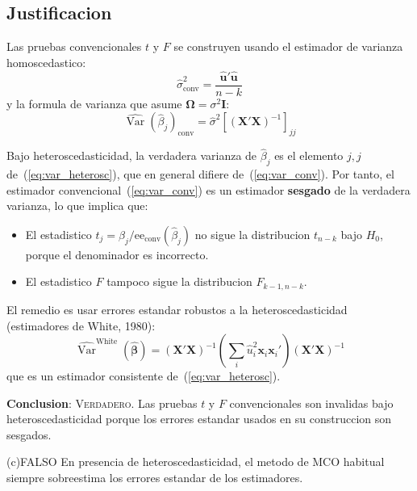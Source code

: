 \documentclass[12pt, letterpaper]{article}
\theoremstyle{remark}
\newcommand{\Var}{\operatorname{Var}}
\begin{document}
\subsection*{Justificacion}

Las pruebas convencionales $t$ y $F$ se construyen usando el estimador de
varianza homoscedastico:
\begin{equation}
  \hat\sigma^2_{\text{conv}} = \frac{\hat{\mathbf{u}}'\hat{\mathbf{u}}}{n - k}
  \label{eq:sigma2_conv}
\end{equation}
y la formula de varianza que asume $\boldsymbol\Omega = \sigma^2\mathbf{I}$:
\begin{equation}
  \widehat{\Var}(\hat\beta_j)_{\text{conv}} = \hat\sigma^2[(\mathbf{X'X})^{-1}]_{jj}
  \label{eq:var_conv}
\end{equation}

Bajo heteroscedasticidad, la verdadera varianza de $\hat\beta_j$ es el
elemento $j,j$ de~(\ref{eq:var_heterosc}), que en general difiere de~(\ref{eq:var_conv}).
Por tanto, el estimador convencional~(\ref{eq:var_conv}) es un estimador
\textbf{sesgado} de la verdadera varianza, lo que implica que:

\begin{itemize}[leftmargin=1.6em, itemsep=3pt]
  \item El estadistico $t_j = \hat\beta_j / \text{ee}_{\text{conv}}(\hat\beta_j)$
    no sigue la distribucion $t_{n-k}$ bajo $H_0$, porque el denominador es incorrecto.
  \item El estadistico $F$ tampoco sigue la distribucion $F_{k-1, n-k}$.
\end{itemize}

El remedio es usar errores estandar robustos a la heteroscedasticidad
(estimadores de White, 1980):
\begin{equation}
  \widehat{\Var}^{\text{White}}(\hat{\boldsymbol\beta})
    = (\mathbf{X'X})^{-1}
      \left(\sum_i \hat u_i^2 \mathbf{x}_i\mathbf{x}_i'\right)
      (\mathbf{X'X})^{-1}
  \label{eq:White_var}
\end{equation}
que es un estimador consistente de~(\ref{eq:var_heterosc}).

\textbf{Conclusion}: \textsc{Verdadero}. Las pruebas $t$ y $F$ convencionales
son invalidas bajo heteroscedasticidad porque los errores estandar usados en
su construccion son sesgados.

\bigskip

\begin{verdict}{(c)}{FALSO}
  En presencia de heteroscedasticidad, el metodo de MCO habitual siempre
  sobreestima los errores estandar de los estimadores.
\end{verdict}
\end{document}
